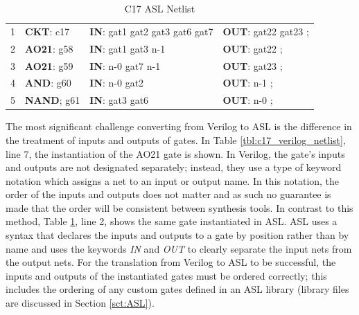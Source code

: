 \documentclass[12pt]{report}
\begin{document}
\begin{table}
  \begin{center}
    \caption{C17 ASL Netlist}
    \begin{tabular}{|l|lll|}
      \hline
      1 & \textbf{CKT}: c17 & \textbf{IN}: gat1 gat2 gat3 gat6 gat7 & \textbf{OUT}: gat22 gat23 ; \\
      2 & \textbf{AO21}: g58 & \textbf{IN}: gat1 gat3 n-1 & \textbf{OUT}: gat22 ; \\  
      3 & \textbf{AO21}: g59 & \textbf{IN}: n-0 gat7 n-1 & \textbf{OUT}: gat23 ; \\  
      4 & \textbf{AND}: g60 & \textbf{IN}: n-0 gat2 & \textbf{OUT}: n-1 ; \\  
      5 & \textbf{NAND}; g61 & \textbf{IN}: gat3 gat6 & \textbf{OUT}: n-0 ; \\ 
      \hline
    \end{tabular}
    \label{tbl:c17_asl_netlist}
  \end{center}
\end{table}
The most significant challenge converting from Verilog to ASL is the difference in the treatment of inputs and outputs of gates.  In Table \ref{tbl:c17_verilog_netlist}, line 7, the instantiation of the AO21 gate is shown.  In Verilog, the gate's inputs and outputs are not designated separately; instead, they use a type of keyword notation which assigns a net to an input or output name.  In this notation, the order of the inputs and outputs does not matter and as such no guarantee is made that the order will be consistent between synthesis tools.  In contrast to this method, Table \ref{tbl:c17_asl_netlist}, line 2, shows the same gate instantiated in ASL.  ASL uses a syntax that declares the inputs and outputs to a gate by position rather than by name and uses the keywords \textit{IN} and \textit{OUT} to clearly separate the input nets from the output nets.  For the translation from Verilog to ASL to be successful, the inputs and outputs of the instantiated gates must be ordered correctly; this includes the ordering of any custom gates defined in an ASL library (library files are discussed in Section \ref{sct:ASL}).   
\end{document}
